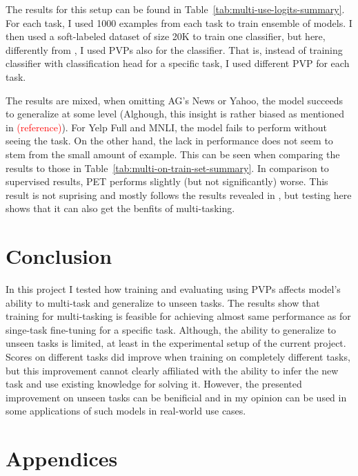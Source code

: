 \documentclass[11pt,a4paper]{article}
\newcommand\todo[1]{\textcolor{red}{#1}}
\begin{document}
The results for this setup can be found in Table~\ref{tab:multi-use-logits-summary}.
For each task, I used 1000 examples from each task to train ensemble of models.
I then used a soft-labeled dataset of size 20K to train one classifier, but here, differently from \citet{schick2020exploiting}, I used PVPs also for the classifier.
That is, instead of training classifier with classification head for a specific task, I used different PVP for each task.

The results are mixed, when omitting AG's News or Yahoo, the model succeeds to generalize at some level (Alghough, this insight is rather biased as mentioned in \todo{(reference)}).
For Yelp Full and MNLI, the model fails to perform without seeing the task.
On the other hand, the lack in performance does not seem to stem from the small amount of example.
This can be seen when comparing the results to those in Table~\ref{tab:multi-on-train-set-summary}.
In comparison to supervised results, PET performs slightly (but not significantly) worse.
This result is not suprising and mostly follows the results revealed in \citet{schick2020exploiting}, but testing here shows that it can also get the benfits of multi-tasking.

\section{Conclusion}
In this project I tested how training and evaluating using PVPs affects model's ability to multi-task and generalize to unseen tasks.
The results show that training for multi-tasking is feasible for achieving almost same performance as for singe-task fine-tuning for a specific task.
Although, the ability to generalize to unseen tasks is limited, at least in the experimental setup of the current project.
Scores on different tasks did improve when training on completely different tasks, but this improvement cannot clearly affiliated with the ability to infer the new task and use existing knowledge for solving it. 
However, the presented improvement on unseen tasks can be benificial and in my opinion can be used in some applications of such models in real-world use cases. 




\newpage
\appendix


\section{Appendices}
\label{sec:appendix}
\end{document}
